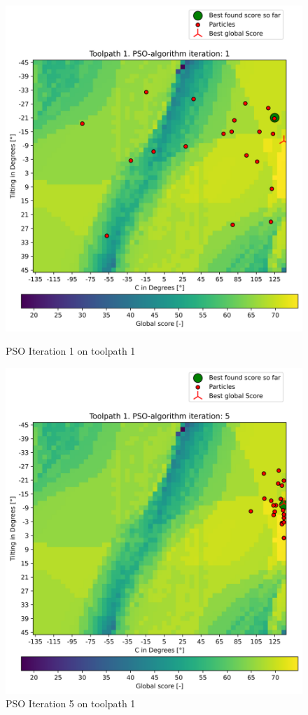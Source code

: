 \begin{figure}[H]	
	\centering
	\begin{minipage}{0.5\textwidth}
		\includegraphics[width=\textwidth]{figures/swarm_true/1_1.png}
		\caption{PSO Iteration 1 on toolpath 1}
		\label{tp1_0}
	\end{minipage}\hfill
	\begin{minipage}{0.5\textwidth}
		\includegraphics[width=\textwidth]{figures/swarm_true/1_5.png}
		\caption{PSO Iteration 5 on toolpath 1}
		\label{tp1_5}
	\end{minipage}\par
\end{figure}


